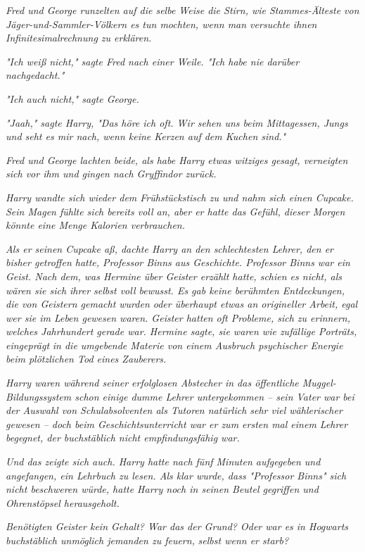 {\emph{Fred und George runzelten auf die selbe Weise die Stirn, wie Stammes-Älteste von Jäger-und-Sammler-Völkern es tun mochten, wenn man versuchte ihnen Infinitesimalrechnung zu erklären.}

\emph{"Ich weiß nicht," sagte Fred nach einer Weile. "Ich habe nie darüber nachgedacht."}

\emph{"Ich auch nicht," sagte George.}

\emph{"Jaah," sagte Harry, "Das höre ich oft. Wir sehen uns beim Mittagessen, Jungs und seht es mir nach, wenn keine Kerzen auf dem Kuchen sind."}

\emph{Fred und George lachten beide, als habe Harry etwas witziges gesagt, verneigten sich vor ihm und gingen nach Gryffindor zurück.}

\emph{Harry wandte sich wieder dem Frühstückstisch zu und nahm sich einen Cupcake. Sein Magen fühlte sich bereits voll an, aber er hatte das Gefühl, dieser Morgen könnte eine Menge Kalorien verbrauchen.}

\emph{Als er seinen Cupcake aß, dachte Harry an den schlechtesten Lehrer, den er bisher getroffen hatte, Professor Binns aus Geschichte. Professor Binns war ein Geist. Nach dem, was Hermine über Geister erzählt hatte, schien es nicht, als wären sie sich ihrer selbst voll bewusst. Es gab keine berühmten Entdeckungen, die von Geistern gemacht wurden oder überhaupt etwas an origineller Arbeit, egal wer sie im Leben gewesen waren. Geister hatten oft Probleme, sich zu erinnern, welches Jahrhundert gerade war. Hermine sagte, sie waren wie zufällige Porträts,} \emph{eingeprägt} \emph{in die umgebende Materie von einem Ausbruch psychischer Energie beim plötzlichen Tod eines Zauberers.}

\emph{Harry waren während seiner erfolglosen Abstecher in das öffentliche Muggel-Bildungssystem schon einige dumme Lehrer untergekommen -- sein Vater war bei der Auswahl von Schulabsolventen als Tutoren natürlich sehr viel wählerischer gewesen -- doch beim Geschichtsunterricht war er zum ersten mal einem Lehrer begegnet, der buchstäblich nicht empfindungsfähig war.}

\emph{Und das zeigte sich auch. Harry hatte nach fünf Minuten aufgegeben und angefangen, ein Lehrbuch zu lesen. Als klar wurde, dass "Professor Binns" sich nicht beschweren würde, hatte Harry noch in seinen Beutel gegriffen und Ohrenstöpsel herausgeholt.}

\emph{Benötigten Geister kein Gehalt? War das der Grund? Oder war es in Hogwarts buchstäblich unmöglich jemanden zu feuern,} \emph{\emph{selbst wenn er starb?}}

}
